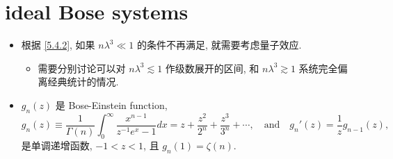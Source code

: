 \chapter{ideal Bose systems}
\begin{itemize}
	\item 根据 \eqref{5.4.2}, 如果 $n \lambda^3 \ll 1$ 的条件不再满足, 就需要考虑量子效应.
	\begin{itemize}
		\item 需要分别讨论可以对 $n \lambda^3 \lesssim 1$ 作级数展开的区间, 和 $n \lambda^3 \gtrsim 1$ 系统完全偏离经典统计的情况.
	\end{itemize}
	
	\item $g_n(z)$ 是 Bose-Einstein function,
	\begin{equation}
		g_n(z) \equiv \frac{1}{\Gamma(n)} \int_0^\infty \frac{x^{n - 1}}{z^{- 1} e^x - 1} dx = z + \frac{z^2}{2^n} + \frac{z^3}{3^n} + \cdots, \quad \text{and} \quad g_n'(z) = \frac{1}{z} g_{n - 1}(z),
	\end{equation}
	是单调递增函数, $- 1 < z < 1$, 且 $g_n(1) = \zeta(n)$.
\end{itemize}

